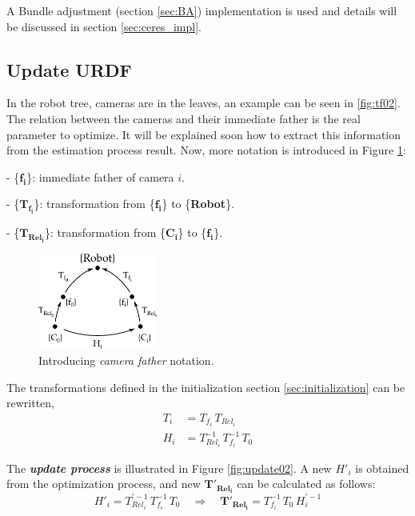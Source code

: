 A Bundle adjustment (section \ref{sec:BA}) implementation is used and details will be discussed in section \ref{sec:ceres_impl}.


\subsection{Update URDF}
\label{sec:update_urdf}

In the robot tree, cameras are in the leaves, an example can be seen in \ref{fig:tf02}. The relation between the cameras and their immediate father is the real parameter to optimize. It will be explained soon how to extract this information from the estimation process result. Now, more notation is introduced in Figure \ref{fig:update01}:
\begin{itemize*}
 \item[-]  \{$\mathbf{f_i}$\}: immediate father of camera $i$.

 \item[-]  \{$\mathbf{T_{f_i}}$\}: transformation from \{$\mathbf{f_i}$\} to \{\textbf{Robot}\}.

 \item[-]  \{$\mathbf{T_{Rel_i}}$\}: transformation from \{$\mathbf{C_i}$\} to \{$\mathbf{f_i}$\}.

\end{itemize*}

\begin{figure}[!htbp]
 \centering
 \includegraphics[width=0.35\textwidth]{images/update01.pdf}
 \caption{Introducing \textit{camera father} notation.}
 \label{fig:update01}
\end{figure}

The transformations defined in the initialization section \ref{sec:initialization} can be rewritten,
\begin{align}
 T_i &= T_{f_i} \, T_{Rel_i} \\
 H_i &= T_{Rel_i}^{-1} \, T_{f_i}^{-1} \, T_0
\end{align}


The \textit{\textbf{update process}} is illustrated in Figure \ref{fig:update02}.
A new $H'_i$ is obtained from the optimization process, and new $\mathbf{T'_{Rel_i}}$ can be calculated as follows:
\begin{equation}
 H'_i = T_{Rel_i}^{' -1} \, T_{f_i}^{-1} \, T_0  \quad \Rightarrow \quad  \mathbf{T'_{Rel_i}} = T_{f_i}^{-1} \, T_0 \, H_{i}^{' -1}
\end{equation}

